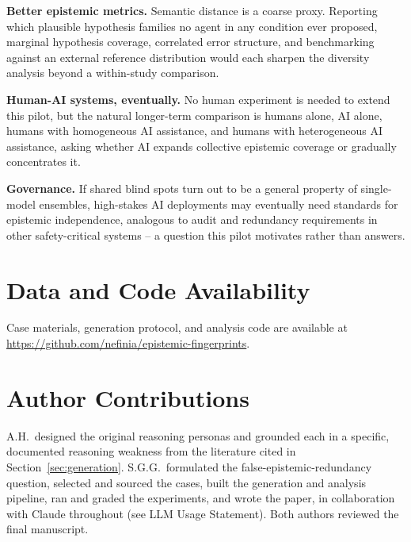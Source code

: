 \documentclass[11pt]{article}
\begin{document}
\textbf{Better epistemic metrics.} Semantic distance is a coarse proxy.
Reporting which plausible hypothesis families no agent in any condition
ever proposed, marginal hypothesis coverage, correlated error structure,
and benchmarking against an external reference distribution
\citep{wright2025} would each sharpen the diversity analysis beyond a
within-study comparison.

\textbf{Human-AI systems, eventually.} No human experiment is needed to
extend this pilot, but the natural longer-term comparison is humans alone,
AI alone, humans with homogeneous AI assistance, and humans with
heterogeneous AI assistance, asking whether AI expands collective
epistemic coverage or gradually concentrates it.

\textbf{Governance.} If shared blind spots turn out to be a general
property of single-model ensembles, high-stakes AI deployments may
eventually need standards for epistemic independence, analogous to audit
and redundancy requirements in other safety-critical systems -- a
question this pilot motivates rather than answers.

\section*{Data and Code Availability}
Case materials, generation protocol, and analysis code are available at
\url{https://github.com/nefinia/epistemic-fingerprints}.

\section*{Author Contributions}
A.H.\ designed the original reasoning personas and grounded each in a
specific, documented reasoning weakness from the literature cited in
Section~\ref{sec:generation}. S.G.G.\ formulated the false-epistemic-redundancy
question, selected and sourced the cases, built the generation and
analysis pipeline, ran and graded the experiments, and wrote the paper,
in collaboration with Claude throughout (see LLM Usage Statement). Both
authors reviewed the final manuscript.
\end{document}
